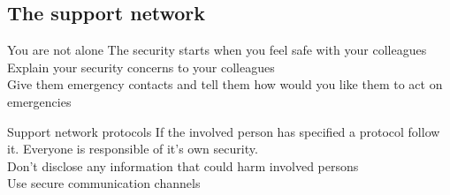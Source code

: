 \documentclass[11pt]{beamer}
\begin{document}
\subsection{The support network}
\begin{frame}{You are not alone}
The security starts when you feel safe with your colleagues\\
Explain your security concerns to your colleagues\\
Give them emergency contacts and tell them how would you like them to act on emergencies\\
\end{frame}
\begin{frame}{Support network protocols}
If the involved person has specified a protocol follow it. Everyone is responsible of it's own security.\\
Don't disclose any information that could harm involved persons\\
Use secure  communication channels
\end{frame}
\end{document}
